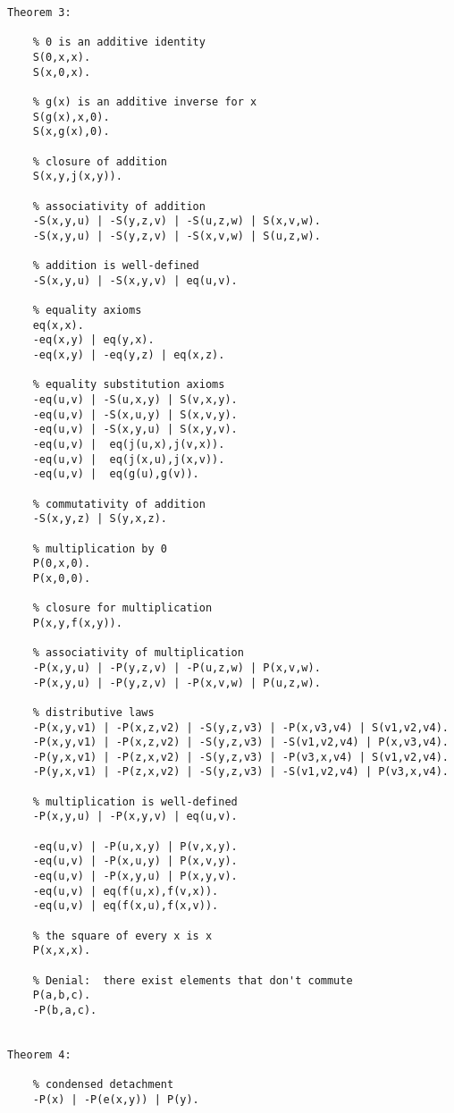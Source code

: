\begin{verbatim}
Theorem 3:
  
    % 0 is an additive identity 
    S(0,x,x).
    S(x,0,x).
  
    % g(x) is an additive inverse for x
    S(g(x),x,0).
    S(x,g(x),0).
  
    % closure of addition
    S(x,y,j(x,y)).
  
    % associativity of addition
    -S(x,y,u) | -S(y,z,v) | -S(u,z,w) | S(x,v,w).
    -S(x,y,u) | -S(y,z,v) | -S(x,v,w) | S(u,z,w).
    
    % addition is well-defined
    -S(x,y,u) | -S(x,y,v) | eq(u,v).
  
    % equality axioms    
    eq(x,x).
    -eq(x,y) | eq(y,x).
    -eq(x,y) | -eq(y,z) | eq(x,z).
  
    % equality substitution axioms
    -eq(u,v) | -S(u,x,y) | S(v,x,y).
    -eq(u,v) | -S(x,u,y) | S(x,v,y).
    -eq(u,v) | -S(x,y,u) | S(x,y,v).
    -eq(u,v) |  eq(j(u,x),j(v,x)).
    -eq(u,v) |  eq(j(x,u),j(x,v)).
    -eq(u,v) |  eq(g(u),g(v)).
  
    % commutativity of addition
    -S(x,y,z) | S(y,x,z).
  
    % multiplication by 0
    P(0,x,0).
    P(x,0,0).
  
    % closure for multiplication
    P(x,y,f(x,y)).
  
    % associativity of multiplication
    -P(x,y,u) | -P(y,z,v) | -P(u,z,w) | P(x,v,w).
    -P(x,y,u) | -P(y,z,v) | -P(x,v,w) | P(u,z,w).
  
    % distributive laws
    -P(x,y,v1) | -P(x,z,v2) | -S(y,z,v3) | -P(x,v3,v4) | S(v1,v2,v4).
    -P(x,y,v1) | -P(x,z,v2) | -S(y,z,v3) | -S(v1,v2,v4) | P(x,v3,v4).
    -P(y,x,v1) | -P(z,x,v2) | -S(y,z,v3) | -P(v3,x,v4) | S(v1,v2,v4).
    -P(y,x,v1) | -P(z,x,v2) | -S(y,z,v3) | -S(v1,v2,v4) | P(v3,x,v4).
  
    % multiplication is well-defined
    -P(x,y,u) | -P(x,y,v) | eq(u,v).
  
    -eq(u,v) | -P(u,x,y) | P(v,x,y).
    -eq(u,v) | -P(x,u,y) | P(x,v,y).
    -eq(u,v) | -P(x,y,u) | P(x,y,v).
    -eq(u,v) | eq(f(u,x),f(v,x)).
    -eq(u,v) | eq(f(x,u),f(x,v)).
  
    % the square of every x is x
    P(x,x,x).

    % Denial:  there exist elements that don't commute
    P(a,b,c).
    -P(b,a,c).


Theorem 4:
  
    % condensed detachment
    -P(x) | -P(e(x,y)) | P(y).
  

\end{verbatim}
